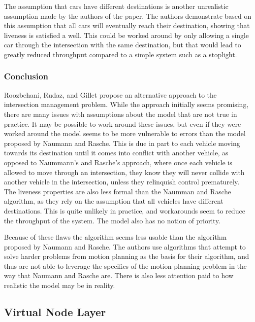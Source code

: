 \documentclass[12pt]{article}
\begin{document}
The assumption that cars have different destinations is another unrealistic assumption made by the authors of the paper. The authors demonstrate based on this assumption that all cars will eventually reach their destination, showing that liveness is satisfied a well. This could be worked around by only allowing a single car through the intersection with the same destination, but that would lead to greatly reduced throughput compared to a simple system such as a stoplight.
\subsubsection{Conclusion}
Roozbehani, Rudaz, and Gillet propose an alternative approach to the intersection management problem. While the approach initially seems promising, there are many issues with assumptions about the model that are not true in practice. It may be possible to work around these issues, but even if they were worked around the model seems to be more vulnerable to errors than the model proposed by Naumann and Rasche. This is due in part to each vehicle moving towards its destination until it comes into conflict with another vehicle, as opposed to Naummann's and Rasche's approach, where once each vehicle is allowed to move through an intersection, they know they will never collide with another vehicle in the intersection, unless they relinquish control prematurely. The liveness properties are also less formal than the Naumman and Rasche algorithm, as they rely on the assumption that all vehicles have different destinations. This is quite unlikely in practice, and workarounds seem to reduce the throughput of the system. The model also has no notion of priority.\par
Because of these flaws the algorithm seems less usable than the algorithm proposed by Naumann and Rasche. The authors use algorithms that attempt to solve harder problems from motion planning as the basis for their algorithm, and thus are not able to leverage the specifics of the motion planning problem in the way that Naumann and Rasche are. There is also less attention paid to how realistic the model may be in reality.

\subsection{Virtual Node Layer}
\label{sec:VNLayer}
\end{document}
